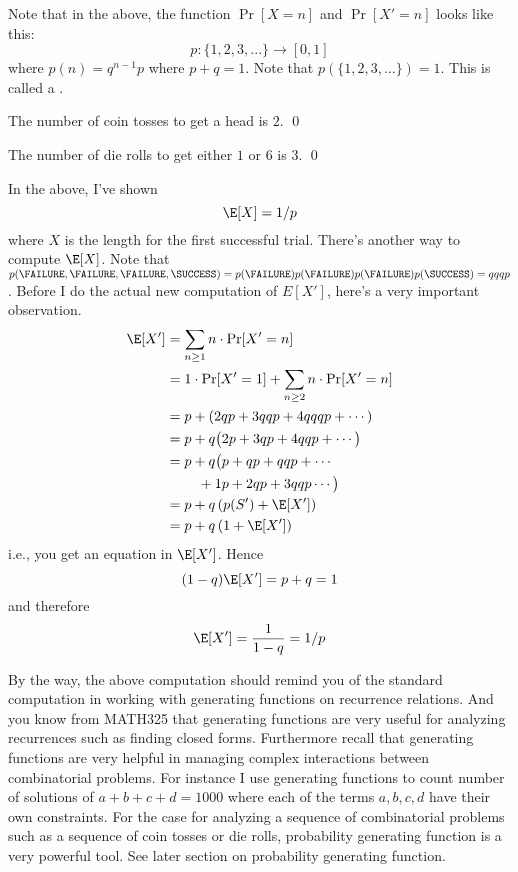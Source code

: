 Note that in the above, the function $\Pr[X = n]$ and $\Pr[X' = n]$ looks like this:
\[
p: \{1, 2, 3, ... \} \rightarrow [0, 1]
\]
where $p(n) = q^{n-1}p$ where $p + q = 1$.
Note that $p(\{1, 2, 3, ...\}) = 1$.
This is called a .

 

\begin{eg}
  The number of coin tosses to get a head is $2$.
  \qed
\end{eg}

\begin{eg}
  The number of die rolls to get either $1$ or $6$ is $3$.
  \qed
\end{eg}

In the above, I've shown
\[
\E[X] = 1/p 
\]
where $X$ is the length for the first successful trial.
There's another way to compute $\E[X]$.
Note that 
$p(\FAILURE, \FAILURE, \FAILURE, \SUCCESS)
= p(\FAILURE) p(\FAILURE) p(\FAILURE) p(\SUCCESS) = qqqp$.
Before I do the actual new computation of $E[X']$, here's a very important observation.
\begin{align*}
  \E[X']
  &= \sum_{n \geq 1} n \cdot \Pr[X' = n] \\
  &= 1 \cdot \Pr[X' = 1] + \sum_{n \geq 2} n \cdot \Pr[X' = n] \\
  &= p + \left( 2 qp + 3 qqp + 4 qqqp + \cdots \right) \\
  &= p + q \bigl( 2 p + 3 qp + 4 qqp + \cdots \bigr) \\
  &= p + q\bigl( p + qp + qqp + \cdots \\
  &\hspace{0.8cm} + 1 p + 2 qp + 3 qqp \cdots \bigr) \\
  &= p + q\left( p(S') + \E[X'] \right) \\
  &= p + q\left( 1 + \E[X'] \right)
\end{align*}
i.e., you get an equation in $\E[X']$.
Hence
\[
(1 - q)\E[X'] = p + q = 1
\]
and therefore
\[
\E[X'] = \frac{1}{1 - q} = 1/p
\]

By the way, the above computation
should remind you of the standard computation in
working with generating functions on recurrence relations.
And you know from MATH325 that generating functions are very
useful for analyzing recurrences such as finding closed forms.
Furthermore recall that generating functions are very helpful
in managing complex interactions between combinatorial problems.
For instance I use generating functions to count number of
solutions of $a + b + c + d = 1000$ where each of the terms
$a,b,c,d$ have their own constraints.
For the case for analyzing a sequence of
combinatorial problems such as a sequence of coin tosses or
die rolls, probability generating function is a very powerful tool.
See later section on probability generating function.








